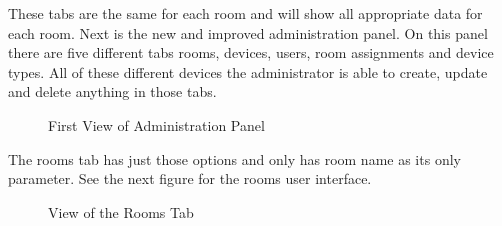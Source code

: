 \documentclass{report}
\begin{document}
\newpage
These tabs are the same for each room and will show all appropriate data for each room. Next is the new and improved administration panel. 
On this panel there are five different tabs rooms, devices, users, room assignments and device types. All of these different devices the administrator is able to create, update and delete anything in those tabs. 
\begin{figure}[H]
	\caption{First View of Administration Panel}
\end{figure}
\newpage
The rooms tab has just those options and only has room name as its only parameter. See the next figure for the rooms user interface.
\begin{figure}[H]
	\caption{View of the Rooms Tab}
\end{figure}
\end{document}
